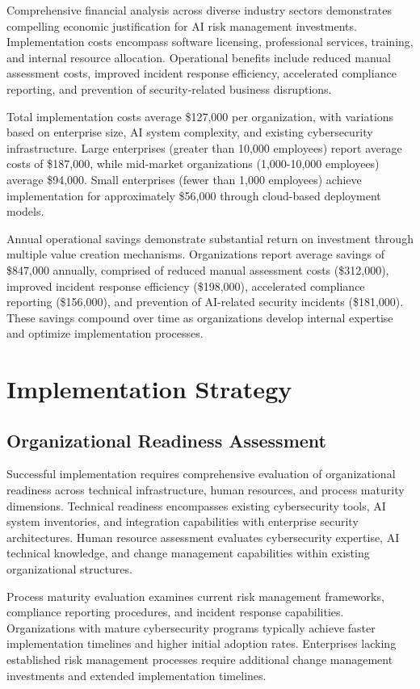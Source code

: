 \documentclass[11pt,letterpaper]{article}
\begin{document}
Comprehensive financial analysis across diverse industry sectors demonstrates compelling economic justification for AI risk management investments. Implementation costs encompass software licensing, professional services, training, and internal resource allocation. Operational benefits include reduced manual assessment costs, improved incident response efficiency, accelerated compliance reporting, and prevention of security-related business disruptions.

Total implementation costs average \$127,000 per organization, with variations based on enterprise size, AI system complexity, and existing cybersecurity infrastructure. Large enterprises (greater than 10,000 employees) report average costs of \$187,000, while mid-market organizations (1,000-10,000 employees) average \$94,000. Small enterprises (fewer than 1,000 employees) achieve implementation for approximately \$56,000 through cloud-based deployment models.

Annual operational savings demonstrate substantial return on investment through multiple value creation mechanisms. Organizations report average savings of \$847,000 annually, comprised of reduced manual assessment costs (\$312,000), improved incident response efficiency (\$198,000), accelerated compliance reporting (\$156,000), and prevention of AI-related security incidents (\$181,000). These savings compound over time as organizations develop internal expertise and optimize implementation processes.

\section{Implementation Strategy}

\subsection{Organizational Readiness Assessment}

Successful implementation requires comprehensive evaluation of organizational readiness across technical infrastructure, human resources, and process maturity dimensions. Technical readiness encompasses existing cybersecurity tools, AI system inventories, and integration capabilities with enterprise security architectures. Human resource assessment evaluates cybersecurity expertise, AI technical knowledge, and change management capabilities within existing organizational structures.

Process maturity evaluation examines current risk management frameworks, compliance reporting procedures, and incident response capabilities. Organizations with mature cybersecurity programs typically achieve faster implementation timelines and higher initial adoption rates. Enterprises lacking established risk management processes require additional change management investments and extended implementation timelines.
\end{document}
